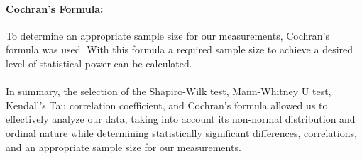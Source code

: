 


\paragraph{Cochran's Formula:}
To determine an appropriate sample size for our measurements, Cochran's formula was used. With this formula a required sample size to achieve a desired level of statistical power can be calculated.\cite{Cochran}

\paragraph{}
In summary, the selection of the Shapiro-Wilk test, Mann-Whitney U test, Kendall's Tau correlation coefficient, and Cochran's formula allowed us to effectively analyze our data, taking into account its non-normal distribution and ordinal nature while determining statistically significant differences, correlations, and an appropriate sample size for our measurements.

